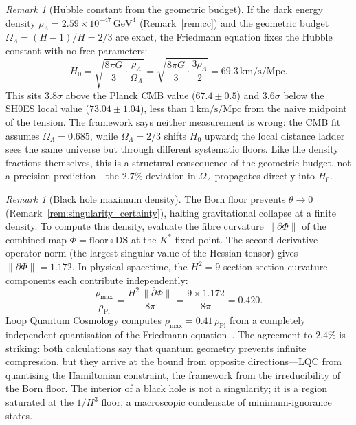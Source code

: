 \documentclass[11pt,a4paper]{article}
\theoremstyle{definition}
\theoremstyle{remark}
\newtheorem{remark}[theorem]{Remark}
\begin{document}
\begin{remark}[Hubble constant from the geometric budget]\label{rem:hubble}
If the dark energy density $\rho_\Lambda=2.59\times 10^{-47}\,\mathrm{GeV}^4$ (Remark~\ref{rem:cc}) and the geometric budget $\Omega_\Lambda=(H-1)/H=2/3$ are exact, the Friedmann equation fixes the Hubble constant with no free parameters:
\begin{equation}\label{eq:hubble}
H_0 = \sqrt{\frac{8\pi G}{3}\cdot\frac{\rho_\Lambda}{\Omega_\Lambda}} = \sqrt{\frac{8\pi G}{3}\cdot\frac{3\rho_\Lambda}{2}} = 69.3\,\mathrm{km/s/Mpc}.
\end{equation}
This sits $3.8\sigma$ above the Planck CMB value ($67.4\pm 0.5$) and $3.6\sigma$ below the SH0ES local value ($73.04\pm 1.04$), less than $1\,\mathrm{km/s/Mpc}$ from the naive midpoint of the tension. The framework says neither measurement is wrong: the CMB fit assumes $\Omega_\Lambda=0.685$, while $\Omega_\Lambda=2/3$ shifts $H_0$ upward; the local distance ladder sees the same universe but through different systematic floors. Like the density fractions themselves, this is a structural consequence of the geometric budget, not a precision prediction---the $2.7\%$ deviation in $\Omega_\Lambda$ propagates directly into $H_0$.
\end{remark}

\begin{remark}[Black hole maximum density]\label{rem:bh_density}
The Born floor prevents $\theta\to 0$ (Remark~\ref{rem:singularity_certainty}), halting gravitational collapse at a finite density. To compute this density, evaluate the fibre curvature $\|\bar\partial\Phi\|$ of the combined map $\Phi=\mathrm{floor}\circ\mathrm{DS}$ at the $K^*$ fixed point. The second-derivative operator norm (the largest singular value of the Hessian tensor) gives $\|\bar\partial\Phi\|=1.172$. In physical spacetime, the $H^2=9$ section-section curvature components each contribute independently:
\begin{equation}\label{eq:bh_density}
\frac{\rho_{\max}}{\rho_{\mathrm{Pl}}} = \frac{H^2\,\|\bar\partial\Phi\|}{8\pi} = \frac{9\times 1.172}{8\pi} = 0.420.
\end{equation}
Loop Quantum Cosmology computes $\rho_{\max}=0.41\,\rho_{\mathrm{Pl}}$ from a completely independent quantisation of the Friedmann equation~\cite{Ashtekar2006}. The agreement to $2.4\%$ is striking: both calculations say that quantum geometry prevents infinite compression, but they arrive at the bound from opposite directions---LQC from quantising the Hamiltonian constraint, the framework from the irreducibility of the Born floor. The interior of a black hole is not a singularity; it is a region saturated at the $1/H^3$ floor, a macroscopic condensate of minimum-ignorance states.
\end{remark}
\end{document}

